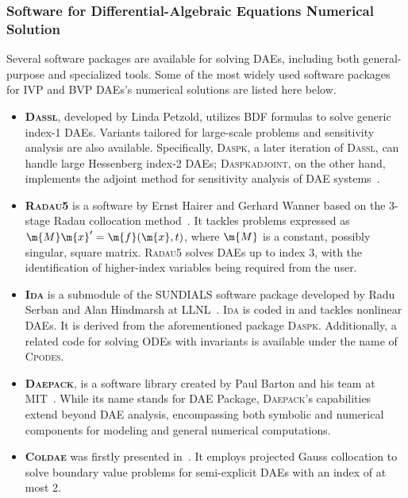 \subsubsection{Software for Differential-Algebraic Equations Numerical Solution}

Several software packages are available for solving \acp{DAE}, including both general-purpose and specialized tools. Some of the most widely used software packages for \ac{IVP} and \ac{BVP} \acp{DAE}'s numerical solutions are listed here below.
%
\begin{itemize}
  \setlength{\itemsep}{0.0em}
  \item \textbf{\textsc{Dassl}}, developed by Linda Petzold, utilizes \ac{BDF} formulas to solve generic index-1 \acp{DAE}. Variants tailored for large-scale problems and sensitivity analysis are also available. Specifically, \textsc{Daspk}, a later iteration of \textsc{Dassl}, can handle large Hessenberg index-2 \acp{DAE}; \textsc{Daspkadjoint}, on the other hand, implements the adjoint method for sensitivity analysis of \ac{DAE} systems~\cite{brenan1995numerical}.
  \item \textbf{\textsc{Radau5}} is a software by Ernst Hairer and Gerhard Wanner based on the 3-stage Radau collocation method~\cite{hairer1999stiff}. It tackles problems expressed as $\m{M}\m{x}^{\prime} = \m{f}(\m{x}, t)$, where $\m{M}$ is a constant, possibly singular, square matrix. \textsc{Radau5} solves \acp{DAE} up to index 3, with the identification of higher-index variables being required from the user.
  \item \textbf{\textsc{Ida}} is a submodule of the \ac{SUNDIALS} software package developed by Radu Serban and Alan Hindmarsh at \ac{LLNL}~\cite{hindmarsh2005sundials, gardner2022sundials}. \textsc{Ida} is coded in \cc{} and tackles nonlinear \acp{DAE}. It is derived from the aforementioned \Fortran{} package \textsc{Daspk}. Additionally, a related code for solving \acp{ODE} with invariants is available under the name of \textsc{Cpodes}.
  \item \textbf{\textsc{Daepack}}, is a software library created by Paul Barton and his team at \ac{MIT}~\cite{tolsma2000daepack}. While its name stands for \ac{DAE} Package, \textsc{Daepack}'s capabilities extend beyond \ac{DAE} analysis, encompassing both symbolic and numerical components for modeling and general numerical computations.
  \item \textbf{\textsc{Coldae}} was firstly presented in~\cite{bader1987new}. It employs projected Gauss collocation to solve boundary value problems for semi-explicit \acp{DAE} with an index of at most 2.
\end{itemize}

